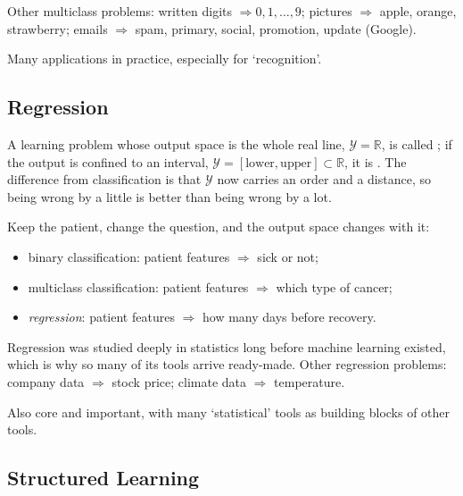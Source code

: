 Other multiclass problems: written digits \(\Rightarrow 0, 1, \dots , 9\);
pictures \(\Rightarrow\) apple, orange, strawberry; emails \(\Rightarrow\) spam,
primary, social, promotion, update (Google).

\begin{moral}
    Many applications in practice, especially for `recognition'.
\end{moral}

\subsection{Regression}

\begin{definition}[Regression]\label{def:regression}
    A learning problem whose output space is the whole real line,
    \(\mathcal{Y} = \mathbb{R}\), is called ; if the output is
    confined to an interval, \(\mathcal{Y} = [\text{lower}, \text{upper}]
    \subset \mathbb{R}\), it is . The difference from
    classification is that \(\mathcal{Y}\) now carries an order and a distance,
    so being wrong by a little is better than being wrong by a lot.
\end{definition}

Keep the patient, change the question, and the output space changes with it:

\begin{itemize}
    \item binary classification: patient features \(\Rightarrow\) sick or not;
    \item multiclass classification: patient features \(\Rightarrow\) which type
        of cancer;
    \item \emph{regression}: patient features \(\Rightarrow\) how many days
        before recovery.
\end{itemize}

Regression was studied deeply in statistics long before machine learning
existed, which is why so many of its tools arrive ready-made. Other regression
problems: company data \(\Rightarrow\) stock price; climate data
\(\Rightarrow\) temperature.

\begin{moral}
    Also core and important, with many `statistical' tools as building blocks of
    other tools.
\end{moral}

\subsection{Structured Learning}


